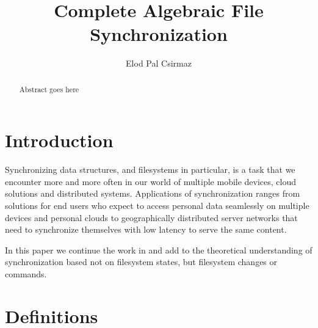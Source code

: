 \documentclass[12pt]{article}
\title{Complete Algebraic File Synchronization}
\author{Elod Pal Csirmaz}
\begin{document}
\maketitle
\begin{abstract}
Abstract goes here
\end{abstract}

\section{Introduction}


Synchronizing data structures, and filesystems in particular,
is a task that we encounter more and more often in our world
of multiple mobile devices, cloud solutions and distributed systems.
Applications of synchronization ranges from
solutions for end users who expect to access personal data seamlessly
on multiple devices and personal clouds to geographically distributed server networks
that need to synchronize themselves with low latency to serve the 
same content.

In this paper we
continue the work in \cite{NREC} and add to the theoretical understanding
of synchronization based not on filesystem states, but filesystem changes or commands.





\section{Definitions}






\end{document}
